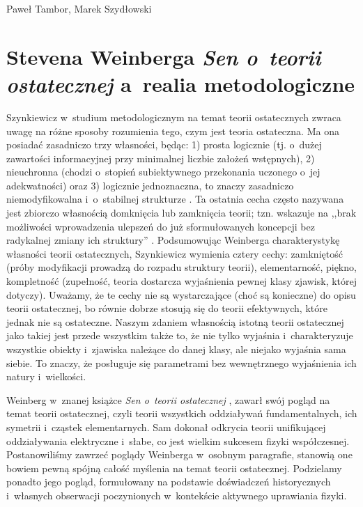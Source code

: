 \begin{artplenv2auth}{Paweł Tambor, Marek Szydłowski}
\section{Stevena Weinberga \textit{Sen o~teorii ostatecznej} a~realia metodologiczne}
Szynkiewicz w~studium metodologicznym na temat teorii ostatecznych zwraca uwagę na różne sposoby rozumienia tego, czym jest teoria ostateczna. Ma ona posiadać zasadniczo trzy własności, będąc: 1) prosta logicznie (tj. o~dużej zawartości informacyjnej przy minimalnej liczbie założeń wstępnych), 2) nieuchronna (chodzi o~stopień subiektywnego przekonania uczonego o~jej adekwatności) oraz 3) logicznie jednoznaczna, to znaczy zasadniczo niemodyfikowalna i~o~stabilnej strukturze 
\parencite[][s.~17]{szynkiewicz_teorie_2009}. %
 Ta ostatnia cecha często nazywana jest zbiorczo własnością domknięcia lub zamknięcia teorii; tzn. wskazuje na ,,brak możliwości wprowadzenia ulepszeń do już sformułowanych koncepcji bez radykalnej zmiany ich struktury'' 
\parencite[][s.~19]{szynkiewicz_teorie_2009}. %
 Podsumowując Weinberga charakterystykę własności teorii ostatecznych, Szynkiewicz wymienia cztery cechy: zamkniętość (próby modyfikacji prowadzą do rozpadu struktury teorii), elementarność, piękno, kompletność (zupełność, teoria dostarcza wyjaśnienia pewnej klasy zjawisk, której dotyczy). Uważamy, że te cechy nie są wystarczające (choć są konieczne) do opisu teorii ostatecznej, bo równie dobrze stosują się do teorii efektywnych, które jednak nie są ostateczne. Naszym zdaniem własnością istotną teorii ostatecznej jako takiej jest przede wszystkim także to, że nie tylko wyjaśnia i~charakteryzuje wszystkie obiekty i~zjawiska należące do danej klasy, ale niejako wyjaśnia sama siebie. To znaczy, że posługuje się parametrami bez wewnętrznego wyjaśnienia ich natury i~wielkości.

Weinberg w~znanej książce \textit{Sen o~teorii ostatecznej}
\parencite*[][]{weinberg_sen_1992}, %
 zawarł swój pogląd na temat teorii ostatecznej, czyli teorii wszystkich oddziaływań fundamentalnych, ich symetrii i~cząstek elementarnych. Sam dokonał odkrycia teorii unifikującej oddziaływania elektryczne i~słabe, co jest wielkim sukcesem fizyki współczesnej. Postanowiliśmy zawrzeć poglądy Weinberga w~osobnym paragrafie, stanowią one bowiem pewną spójną całość myślenia na temat teorii ostatecznej. Podzielamy ponadto jego pogląd, formułowany na podstawie doświadczeń historycznych i~własnych obserwacji poczynionych w~kontekście aktywnego uprawiania fizyki.


\end{artplenv2auth}
